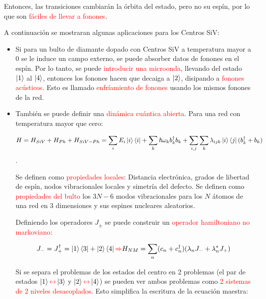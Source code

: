 \documentclass{book}
\begin{document}
Entonces, las transiciones cambiarán la órbita del estado, pero no su espín, por lo que son \textcolor{red}{fáciles de llevar a fonones}.

A continuación se mostraran algunas aplicaciones para los Centros SiV:

\begin{itemize}
    \item Si para un bulto de diamante dopado con Centros SiV a temperatura mayor a 0 se le induce un campo externo, se puede absorber datos de fonones en el espín. Por lo tanto, se puede \textcolor{red}{introducir una microonda}, llevando del estado $\ket{1}$ al $\ket{4}$, entonces los fonones hacen que decaiga a $\ket{2}$, disipando a \textcolor{red}{fonones acústicos}. Esto es llamado \textcolor{red}{enfríamiento de fonones} usando los mismos fonones de la red.
    \item También se puede definir una \textcolor{red}{dinámica cuántica abierta}. Para una red con temperatura mayor que cero:
    
    \begin{equation}\label{eq8.42}H=H_{SiV}+H_{Ph}+H_{SiV-Ph}=\sum_i E_i\ket{i}\bra{i}+\sum_k \hslash \omega_k b_k^\dag b_k+\sum_{i,j}\sum_k\lambda_{ijk}\ket{i}\bra{j}(b_k^\dag+b_k)\end{equation}.
    
    Se definen como \textcolor{red}{propiedades locales}: Distancia electrónica, grados de libertad de espín, nodos vibracionales locales y simetría del defecto. Se definen como \textcolor{red}{propiedades del bulto} los $3N-6$ modos vibracionales para los $N$ átomos de una red en $3$ dimensiones y sus espines nucleares aleatorios. 
    
    Definiendo los operadores $J_\pm$ se puede construir un \textcolor{red}{operador hamiltoniano no markoviano}:
    
    \begin{equation}\label{eq8.43}J_-=J_+^\dag=\ket{1}\bra{3}+\ket{2}\bra{4}\textcolor{red}{\Rightarrow}H_{NM}=\sum_n(c_n+c_n^\dag)(\lambda_nJ_-+\lambda_n^*J_+)\end{equation}
    
    Si se separa el problemas de los estados del centro en 2 problemas (el par de estados $\ket{1}\textcolor{red}{\leftrightarrow}\ket{3}$ y $\ket{2}\textcolor{red}{\leftrightarrow}\ket{4}$) se pueden ver ambos problemas como \textcolor{red}{2 sistemas de 2 niveles desacoplados}. Esto simplifica la escritura de la ecuación maestra:
    

\end{itemize}
\end{document}
